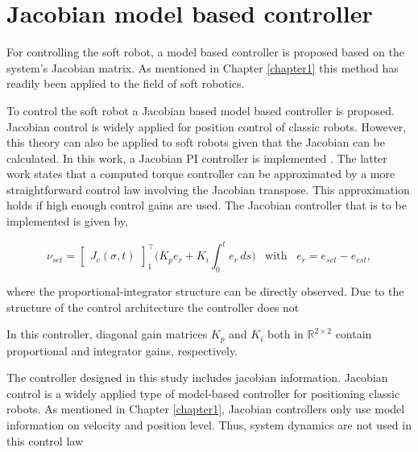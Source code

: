 \section{Jacobian model based controller}


For controlling the soft robot, a model based controller is proposed based on the system's Jacobian matrix. As mentioned in Chapter \ref{chapter1} this method has readily been applied to the field of soft robotics. 


To control the soft robot a Jacobian based model based controller is proposed. Jacobian control is widely applied for position control of classic robots. However, this theory can also be applied to soft robots given that the Jacobian can be calculated. In this work, a Jacobian PI controller is implemented \cite{MOOSAVIAN20071226}. The latter work states that a computed torque controller can be approximated by a more straightforward control law involving the Jacobian transpose. This approximation holds if high enough control gains are used. The Jacobian controller that is to be implemented is given by,


\begin{equation}
    \nu_{set} = \begin{bmatrix}J_c(\sigma,t)\end{bmatrix}_1^\top \Big(K_p e_r + K_i \int_0^t e_r \hspace{2pt} ds \Big) \hspace{10pt} \text{with} \hspace{10pt} e_r = e_{set}-e_{est}, 
    \label{eq:tau}
\end{equation}

where the proportional-integrator structure can be directly observed. Due to the structure of the control architecture the controller does not 

In this controller, diagonal gain matrices $K_p$ and $K_i$ both in $\mathbb{R}^{2\times 2}$ contain proportional and integrator gains, respectively. 


The controller designed in this study includes jacobian information. Jacobian control is a widely applied type of model-based controller for positioning classic robots. As mentioned in Chapter \ref{chapter1}, Jacobian controllers only use model information on velocity and position level. Thus, system dynamics are not used in this control law

